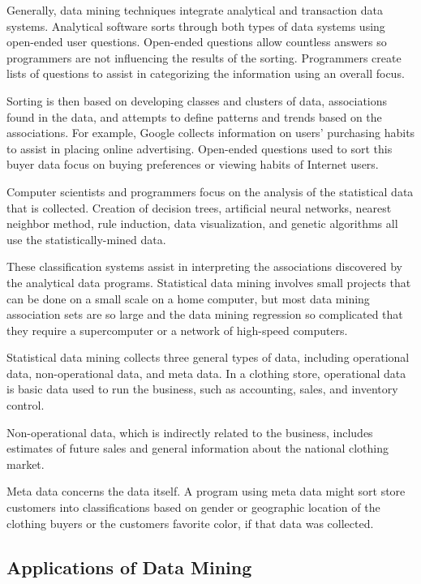 \documentclass[11pt]{article} %
\begin{document}
Generally, data mining techniques integrate analytical and transaction data systems. Analytical software sorts through both types of data systems using open-ended user questions. Open-ended questions allow countless answers so programmers are not influencing the results of the sorting. Programmers create lists of questions to assist in categorizing the information using an overall focus.


Sorting is then based on developing classes and clusters of data, associations found in the data, and attempts to define patterns and trends based on the associations. For example, Google collects information on users' purchasing habits to assist in placing online advertising. Open-ended questions used to sort this buyer data focus on buying preferences or viewing habits of Internet users.


Computer scientists and programmers focus on the analysis of the statistical data that is collected. Creation of decision trees, artificial neural networks, nearest neighbor method, rule induction, data visualization, and genetic algorithms all use the statistically-mined data. 


These classification systems assist in interpreting the associations discovered by the analytical data programs. Statistical data mining involves small projects that can be done on a small scale on a home computer, but most data mining association sets are so large and the data mining regression so complicated that they require a supercomputer or a network of high-speed computers.


Statistical data mining collects three general types of data, including operational data, non-operational data, and meta data. In a clothing store, operational data is basic data used to run the business, such as accounting, sales, and inventory control. 


Non-operational data, which is indirectly related to the business, includes estimates of future sales and general information about the national clothing market. 


Meta data concerns the data itself. A program using meta data might sort store customers into classifications based on gender or geographic location of the clothing buyers or the customers favorite color, if that data was collected.


\subsection{Applications of Data Mining}
\end{document}
